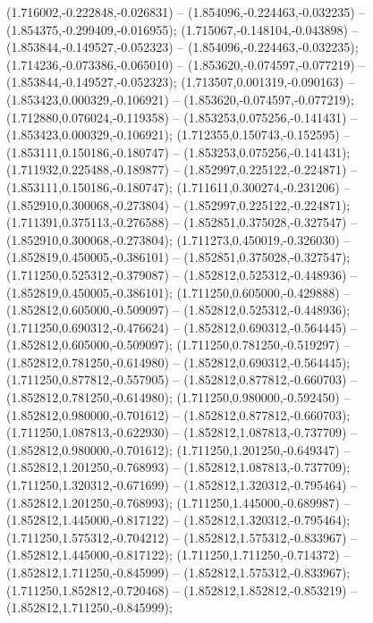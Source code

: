  (1.716002,-0.222848,-0.026831) -- (1.854096,-0.224463,-0.032235) -- (1.854375,-0.299409,-0.016955);
 (1.715067,-0.148104,-0.043898) -- (1.853844,-0.149527,-0.052323) -- (1.854096,-0.224463,-0.032235);
 (1.714236,-0.073386,-0.065010) -- (1.853620,-0.074597,-0.077219) -- (1.853844,-0.149527,-0.052323);
 (1.713507,0.001319,-0.090163) -- (1.853423,0.000329,-0.106921) -- (1.853620,-0.074597,-0.077219);
 (1.712880,0.076024,-0.119358) -- (1.853253,0.075256,-0.141431) -- (1.853423,0.000329,-0.106921);
 (1.712355,0.150743,-0.152595) -- (1.853111,0.150186,-0.180747) -- (1.853253,0.075256,-0.141431);
 (1.711932,0.225488,-0.189877) -- (1.852997,0.225122,-0.224871) -- (1.853111,0.150186,-0.180747);
 (1.711611,0.300274,-0.231206) -- (1.852910,0.300068,-0.273804) -- (1.852997,0.225122,-0.224871);
 (1.711391,0.375113,-0.276588) -- (1.852851,0.375028,-0.327547) -- (1.852910,0.300068,-0.273804);
 (1.711273,0.450019,-0.326030) -- (1.852819,0.450005,-0.386101) -- (1.852851,0.375028,-0.327547);
 (1.711250,0.525312,-0.379087) -- (1.852812,0.525312,-0.448936) -- (1.852819,0.450005,-0.386101);
 (1.711250,0.605000,-0.429888) -- (1.852812,0.605000,-0.509097) -- (1.852812,0.525312,-0.448936);
 (1.711250,0.690312,-0.476624) -- (1.852812,0.690312,-0.564445) -- (1.852812,0.605000,-0.509097);
 (1.711250,0.781250,-0.519297) -- (1.852812,0.781250,-0.614980) -- (1.852812,0.690312,-0.564445);
 (1.711250,0.877812,-0.557905) -- (1.852812,0.877812,-0.660703) -- (1.852812,0.781250,-0.614980);
 (1.711250,0.980000,-0.592450) -- (1.852812,0.980000,-0.701612) -- (1.852812,0.877812,-0.660703);
 (1.711250,1.087813,-0.622930) -- (1.852812,1.087813,-0.737709) -- (1.852812,0.980000,-0.701612);
 (1.711250,1.201250,-0.649347) -- (1.852812,1.201250,-0.768993) -- (1.852812,1.087813,-0.737709);
 (1.711250,1.320312,-0.671699) -- (1.852812,1.320312,-0.795464) -- (1.852812,1.201250,-0.768993);
 (1.711250,1.445000,-0.689987) -- (1.852812,1.445000,-0.817122) -- (1.852812,1.320312,-0.795464);
 (1.711250,1.575312,-0.704212) -- (1.852812,1.575312,-0.833967) -- (1.852812,1.445000,-0.817122);
 (1.711250,1.711250,-0.714372) -- (1.852812,1.711250,-0.845999) -- (1.852812,1.575312,-0.833967);
 (1.711250,1.852812,-0.720468) -- (1.852812,1.852812,-0.853219) -- (1.852812,1.711250,-0.845999);
